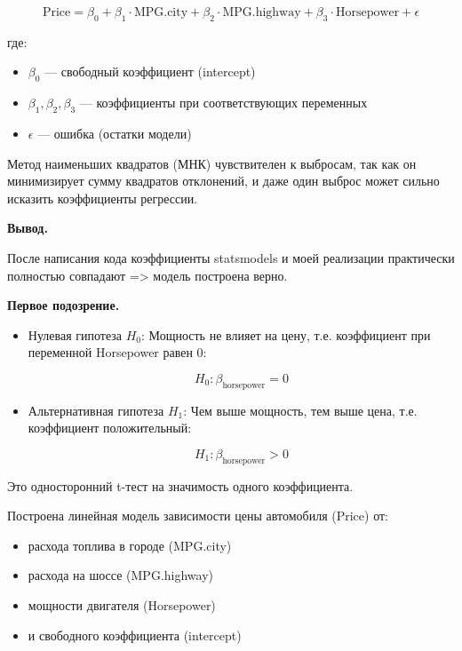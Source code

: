\documentclass[12pt]{article}
\begin{document}
	$$ \text{Price} = \beta_0 + \beta_1 \cdot \text{MPG.city} + \beta_2 \cdot \text{MPG.highway} + \beta_3 \cdot \text{Horsepower} + \epsilon $$
	
	где:
	\begin{itemize}
		\item $\beta_0$ — свободный коэффициент (intercept)
		\item $\beta_1, \beta_2, \beta_3$ — коэффициенты при соответствующих переменных
		\item $\epsilon$ — ошибка (остатки модели)
	\end{itemize}
	
	Метод наименьших квадратов (МНК) чувствителен к выбросам, так как он минимизирует сумму квадратов отклонений, и даже один выброс может сильно исказить коэффициенты регрессии.
	\vspace*{1em}
	
	\textbf{Вывод.}
	
	После написания кода коэффициенты statsmodels и моей реализации практически полностью совпадают => модель построена верно.
	\vspace*{1em}
	
	\textbf{Первое подозрение.}
	
	\begin{itemize}
		\item Нулевая гипотеза $H_0$: Мощность не влияет на цену, т.е. коэффициент при переменной Horsepower равен 0:
		
		$$ H_0: \beta_{\text{horsepower}} = 0 $$
		
		\item Альтернативная гипотеза $H_1$: Чем выше мощность, тем выше цена, т.е. коэффициент положительный:
		
		$$ H_1: \beta_{\text{horsepower}} > 0 $$
	\end{itemize}
	
	Это односторонний t-тест на значимость одного коэффициента.
	
	Построена линейная модель зависимости цены автомобиля (Price) от:
	
	\begin{itemize}
		\item расхода топлива в городе (MPG.city)
		\item расхода на шоссе (MPG.highway)
		\item мощности двигателя (Horsepower)
		\item и свободного коэффициента (intercept)
	\end{itemize}
	
\end{document}
